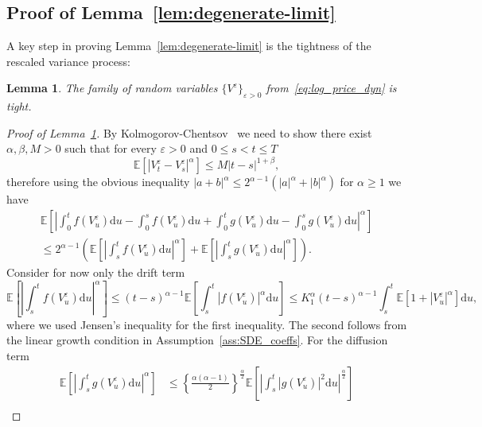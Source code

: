 \documentclass{amsart}[11pt]
\numberwithin{equation}{section}
\numberwithin{theorem}{subsection}
\numberwithin{proposition}{subsection}
\numberwithin{definition}{subsection}
\newtheorem{lemma}{Lemma}
\numberwithin{lemma}{subsection}
\numberwithin{assumption}{subsection}
\newcommand{\EE}{\mathbb{E}}
\newcommand{\D}{\mathrm{d}}
\newcommand{\eps}{\varepsilon}
\begin{document}


\subsection{Proof of Lemma~\ref{lem:degenerate-limit}}\label{sec:lem:degenerate-limit_Proof}
A key step in proving Lemma~\ref{lem:degenerate-limit}
is the tightness of the rescaled variance process:
\begin{lemma}\label{lem:tightness}
The family of random variables $\{V^\eps\}_{\eps>0}$ from~\eqref{eq:log_price_dyn} is tight.
\end{lemma}

\begin{proof}[Proof of Lemma~\ref{lem:tightness}]
By Kolmogorov-Chentsov~\cite[Theorem 21.42]{Klenke2014} we need to show there exist $\alpha, \beta, M > 0$ such that for every $\eps >0$ and $0\leq s < t \leq T$
\[
\EE\left[\left\vert V_t^\eps - V_s^\eps\right\vert^\alpha\right] \leq M \left\vert t - s\right\vert^{1+\beta},
\]
therefore using the obvious inequality 
$|a+b|^{\alpha} \leq 2^{\alpha-1}\left(|a|^{\alpha}+|b|^{\alpha}\right)$ for $\alpha\geq1$ we have
\begin{align*}
\EE\left[ \left\vert \int_0^t f(V_u^\eps)\D u - \int_0^s f(V_u^\eps)\D u + \int_0^t g(V_u^\eps)\D u - \int_0^s g(V_u^\eps)\D u \right \vert^\alpha \right ] \\ \leq 2^{\alpha-1} \left( \EE\left[ \left\vert  \int_s^t f(V_u^\eps) \D u \right\vert^\alpha \right ] + \EE\left[ \left\vert  \int_s^t g(V_u ^\eps) \D u \right\vert^\alpha \right] \right).
\end{align*}
Consider for now only the drift term
$$
\EE\left[ \left\vert  \int_s^t f(V_u^\eps) \D u \right\vert^\alpha \right ]
\leq (t-s)^{\alpha-1}\EE\left[ \int_s^t \left\vert f(V_u^\eps)\right\vert^\alpha \D u  \right ]
\leq K_1^\alpha(t-s)^{\alpha-1}\int_s^t \EE\left[ 1 + \left\vert V_u^\eps\right\vert^\alpha \right]\D u,
$$
where we used Jensen's inequality for the first inequality. 
The second follows from the linear growth condition in Assumption~\ref{ass:SDE_coeffs}. For the diffusion term
\begin{align*}
\EE\left[ \left\vert  \int_s^t g(V_u ^\eps) \D u \right\vert^\alpha \right] 
&\leq \left\{\frac{\alpha(\alpha-1)}{2}\right\}^{\frac{\alpha}{2}} \EE\left[ \left\vert  \int_s^t \left\vert g(V_u ^\eps)\right\vert^{2} \D u \right\vert^{\frac{\alpha}{2}} \right]\\

\end{align*}
\end{proof}
\end{document}
